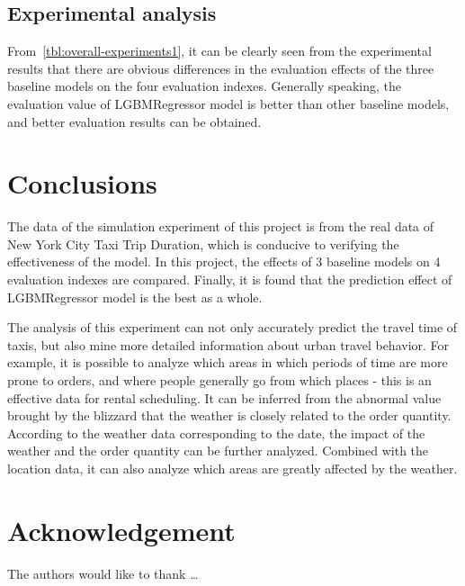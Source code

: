 \subsection{Experimental analysis}
From~\cref{tbl:overall-experiments1}, it can be clearly seen from the experimental results that there are obvious differences in the evaluation effects of the three baseline models on the four evaluation indexes. Generally speaking, the evaluation value of LGBMRegressor model is better than other baseline models, and better evaluation results can be obtained.



\section{Conclusions} \label{sec-conclusions}
The data of the simulation experiment of this project is from the real data of New York City Taxi Trip Duration, which is conducive to verifying the effectiveness of the model. In this project, the effects of 3 baseline models on 4 evaluation indexes are compared. Finally, it is found that the prediction effect of LGBMRegressor model is the best as a whole.

The analysis of this experiment can not only accurately predict the travel time of taxis, but also mine more detailed information about urban travel behavior. For example, it is possible to analyze which areas in which periods of time are more prone to orders, and where people generally go from which places - this is an effective data for rental scheduling. It can be inferred from the abnormal value brought by the blizzard that the weather is closely related to the order quantity. According to the weather data corresponding to the date, the impact of the weather and the order quantity can be further analyzed. Combined with the location data, it can also analyze which areas are greatly affected by the weather.

\section*{Acknowledgement}

\lipsum[1]


The authors would like to thank \ldots

